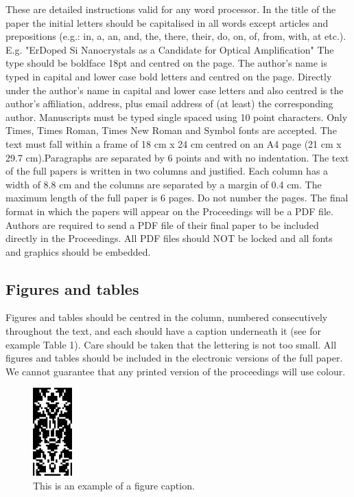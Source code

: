 \documentclass[10pt]{article}
\begin{document}
These are detailed instructions valid for any word
processor. In the title of the paper the initial letters should be
capitalised in all words except articles and prepositions (e.g.:
in, a, an, and, the, there, their, do, on, of, from, with, at etc.).
E.g. "ErDoped Si Nanocrystals as a Candidate for Optical
Amplification" The type should be boldface 18pt and centred
on the page. The author’s name is typed in capital and lower
case bold letters and centred on the page. Directly under the
author’s name in capital and lower case letters and also
centred is the author’s affiliation, address, plus email
address of (at least) the corresponding author. Manuscripts must be
typed single spaced using 10 point characters. Only Times,
Times Roman, Times New Roman and Symbol fonts are
accepted. The text must fall within a frame of 18 cm x 24 cm
centred on an A4 page (21 cm x 29.7 cm).Paragraphs are
separated by 6 points and with no indentation. The text of the
full papers is written in two columns and justified. Each
column has a width of 8.8 cm and the columns are separated
by a margin of 0.4 cm. The maximum length of the full paper
is 6 pages. Do not number the pages. The final format in
which the papers will appear on the Proceedings will be a
PDF file. Authors are required to send a PDF file of their
final paper to be included directly in the Proceedings. All
PDF files should NOT be locked and all fonts and
graphics should be embedded.

\subsection{Figures and tables}
Figures and tables should be centred in the column, numbered
consecutively throughout the text, and each should have a
caption underneath it (see for example Table 1). Care should
be taken that the lettering is not too small. All figures and
tables should be included in the electronic versions of the full
paper. We cannot guarantee that any printed version of the
proceedings will use colour.


\begin{figure}[h]
\centering
\includegraphics[width=1.5cm]{fig1}
\caption{\label{tab1}This is an example of a figure caption.} 
\end{figure}
\end{document}
